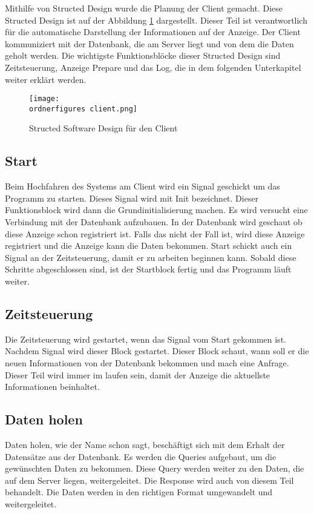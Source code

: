 Mithilfe von Structed Design wurde die Planung der Client gemacht. Diese Structed Design ist auf der Abbildung \ref{fi:structed_design_client} dargestellt. 
Dieser Teil ist verantwortlich f\"{u}r die automatische Darstellung der Informationen auf der Anzeige. Der Client kommuniziert mit der Datenbank, die am Server liegt und von dem die Daten geholt werden. Die wichtigste Funktionsbl\"{o}cke dieser Structed Design sind Zeitsteuerung, Anzeige Prepare und das Log, die in dem folgenden Unterkapitel weiter erkl\"{a}rt werden.

\begin{figure}[ht]
	\centering
	\texttt{[image: \\ordnerfigures client.png]}
	\caption{Structed Software Design für den Client}
	\label{fi:structed_design_client}
\end{figure}

\subsection{Start}
Beim Hochfahren des Systems am Client wird ein Signal geschickt um das Programm zu starten. Dieses Signal wird mit Init bezeichnet. Dieser Funktionsblock wird dann die Grundinitialisierung machen. Es wird versucht eine Verbindung mit der Datenbank aufzubauen. In der Datenbank wird geschaut ob diese Anzeige schon registriert ist. Falls das nicht der Fall ist, wird diese Anzeige registriert und die Anzeige kann die Daten bekommen. Start schickt auch ein Signal an der Zeitsteuerung, damit er zu arbeiten beginnen kann. Sobald diese Schritte abgeschlossen sind, ist der Startblock fertig und das Programm l\"{a}uft weiter.

\subsection{Zeitsteuerung}
Die Zeitsteuerung wird gestartet, wenn das Signal vom Start gekommen ist. Nachdem Signal wird dieser Block gestartet. Dieser Block schaut, wann soll er die neuen Informationen von der Datenbank bekommen und mach eine Anfrage. Dieser Teil wird immer im laufen sein, damit der Anzeige die aktuellste Informationen beinhaltet.

\subsection{Daten holen}
Daten holen, wie der Name schon sagt, beschäftigt sich mit dem Erhalt der Datensätze aus der Datenbank. Es werden die Queries aufgebaut, um die gewünschten Daten zu bekommen. Diese Query werden weiter zu den Daten, die auf dem Server liegen, weitergeleitet. Die Response wird auch von diesem Teil behandelt. Die Daten werden in den richtigen Format umgewandelt und weitergeleitet.



